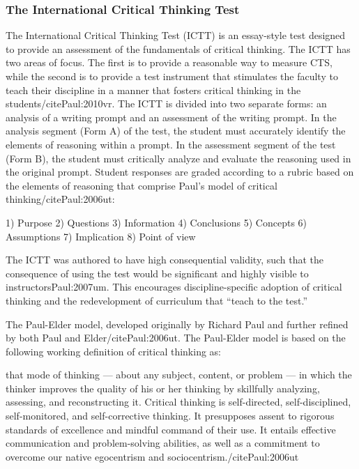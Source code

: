 \subsubsection{The International Critical Thinking Test}

The International Critical Thinking Test (ICTT) is an essay-style test designed to provide an assessment of the fundamentals of critical thinking. The ICTT has two areas of focus. The first is to provide a reasonable way to measure CTS, while the second is to provide a test instrument that stimulates the faculty to teach their discipline in a manner that fosters critical thinking in the students/cite{Paul:2010vr}. The ICTT is divided into two separate forms: an analysis of a writing prompt and an assessment of the writing prompt. In the analysis segment (Form A) of the test, the student must accurately identify the elements of reasoning within a prompt. In the assessment segment of the test (Form B), the student must critically analyze and evaluate the reasoning used in the original prompt. Student responses are graded according to a rubric based on the elements of reasoning that comprise Paul’s model of critical thinking/cite{Paul:2006ut}:

1)	Purpose
2)	Questions
3)	Information
4)	Conclusions
5)	Concepts
6)	Assumptions
7)	Implication
8)	Point of view

The ICTT was authored to have high consequential validity, such that the consequence of using the test would be significant and highly visible to instructors{Paul:2007um}. This encourages discipline-specific adoption of critical thinking and the redevelopment of curriculum that “teach to the test.”

The Paul-Elder model, developed originally by Richard Paul and further refined by both Paul and Elder/cite{Paul:2006ut}. The Paul-Elder model is based on the following working definition of critical thinking as:

that mode of thinking — about any subject, content, or problem — in which the thinker improves the quality of his or her thinking by skillfully analyzing, assessing, and reconstructing it. Critical thinking is self-directed, self-disciplined, self-monitored, and self-corrective thinking. It presupposes assent to rigorous standards of excellence and mindful command of their use. It entails effective communication and problem-solving abilities, as well as a commitment to overcome our native egocentrism and sociocentrism./cite{Paul:2006ut}

